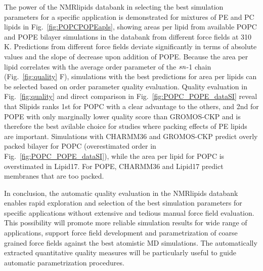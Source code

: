 \documentclass[fleqn,10pt]{wlscirep}
\begin{document}
The power of the NMRlipids databank in selecting the best simulation parameters for a specific application is demonstrated for mixtures of PE and PC lipids in Fig.~\ref{fig:POPCPOPEapls}, showing areas per lipid from available POPC and POPE bilayer simulations in the databank from different force fields at 310\,K. Predictions from different force fields deviate significantly in terms of absolute values and the slope of decrease upon addition of POPE. Because the area per lipid correlates with the average order parameter of the $\it{sn}$-1 chain (Fig.~\ref{fig:quality} F), simulations with the best predictions for area per lipids can be selected based on order parameter quality evaluation. Quality evaluation in Fig.~\ref{fig:quality} and direct comparison in Fig.~\ref{fig:POPC_POPE_dataSI} reveal that Slipids ranks 1st for POPC with a clear advantage to the others, and 2nd for POPE with only marginally lower quality score than GROMOS-CKP and is therefore the best avilable choice for studies where packing effects of PE lipids are important. 
Simulations with CHARMM36 and GROMOS-CKP predict overly packed bilayer for POPC (overestimated order in Fig.~\ref{fig:POPC_POPE_dataSI}), while the area per lipid for POPC is overstimated in Lipid17. For POPE, 
CHARMM36 and Lipid17 predict membranes that are too packed. 


In conclusion, 
the automatic quality evaluation in the NMRlipids databank enables rapid exploration and selection of the best simulation parameters for specific applications without extensive and tedious manual force field evaluation. This possibility will promote more reliable simulation results for wide range of applications, support force field development and parametrization of coarse grained force fields against the best atomistic MD simulations. The automatically extracted quantitative quality measures will be particularly useful to guide automatic parametrization procedures.
\end{document}
